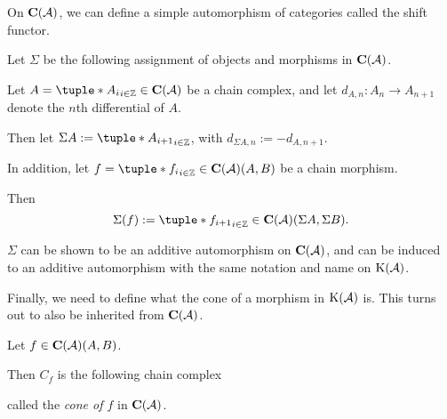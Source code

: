 On \( \C(\Ac) \), we can define a simple automorphism of categories called the shift functor.

\begin{definition}
    \label{def:chain_complex_shift}
    Let \( \Sigma \) be the following assignment of objects and morphisms in \( \C(\Ac) \).

    Let \( A = \tuple*{A_i}_{i \in \Zb} \in \C(\Ac) \) be a chain complex, and let \( d_{A, n}: A_n \to A_{n + 1} \) denote the \( n \)th differential of \( A \).

    Then let \( \Sigma A := \tuple*{A_{i + 1}}_{i \in \Zb} \), with \( d_{\Sigma A, n} := -d_{A, n + 1} \).

    In addition, let \( f = \tuple*{f_i}_{i \in \Zb} \in \C(\Ac)(A, B) \) be a chain morphism.
    
    Then
    \[
        \Sigma(f) := \tuple*{f_{i + 1}}_{i \in \Zb} \in \C(\Ac)(\Sigma A, \Sigma B).
    \]
\end{definition}

\( \Sigma \) can be shown to be an additive automorphism on \( \C(\Ac) \), and can be induced to an additive automorphism with the same notation and name on \( \operatorname{K}({\mathcal{A}}) \).

Finally, we need to define what the cone of a morphism in \( \operatorname{K}({\mathcal{A}}) \) is. This turns out to also be inherited from \( \C(\Ac) \).

\begin{definition}[Cone in \( \C(\Ac) \)]
    Let \( f \in \operatorname{\mathbf{C}}({\mathcal{A}})(A, B) \).

    Then \( C_f \) is the following chain complex
    \begin{center}
    \end{center}
    called the \emph{cone of \( f \)} in \( \C(\Ac) \).
\end{definition}

